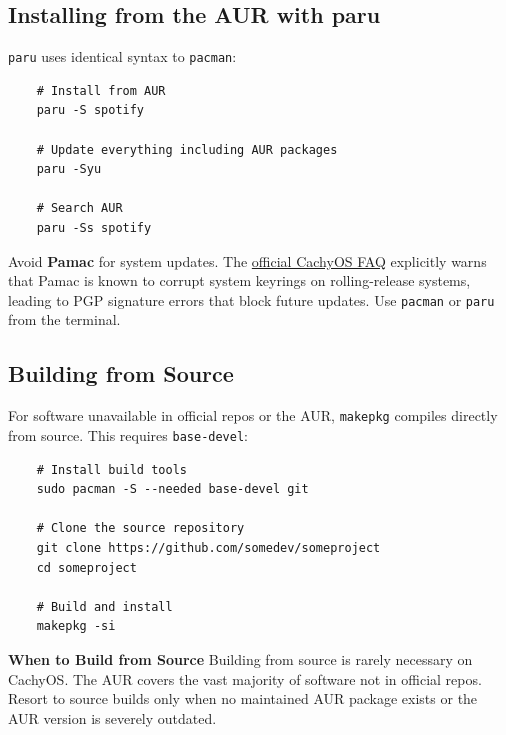 \documentclass{article}
\newcommand{\code}[1]{\colorbox{codebg}{\texttt{#1}}}
\begin{document}
\subsection{Installing from the AUR with paru}

\code{paru} uses identical syntax to \code{pacman}:

\begin{verbatim}
	# Install from AUR
	paru -S spotify
	
	# Update everything including AUR packages
	paru -Syu
	
	# Search AUR
	paru -Ss spotify
\end{verbatim}

\begin{tcolorbox}[arc=12pt, outer arc=10pt,
	colback=red!5!white, colframe=red!60!black,
	title=\textbf{Warning}]
	Avoid \textbf{Pamac} for system updates. The
	\href{https://wiki.cachyos.org/cachyos_basic/faq/}{official CachyOS FAQ}
	explicitly warns that Pamac is known to corrupt system keyrings on rolling-release
	systems, leading to PGP signature errors that block future updates. Use
	\code{pacman} or \code{paru} from the terminal.
\end{tcolorbox}

\subsection{Building from Source}

For software unavailable in official repos or the AUR, \code{makepkg} compiles
directly from source. This requires \code{base-devel}:

\begin{verbatim}
	# Install build tools
	sudo pacman -S --needed base-devel git
	
	# Clone the source repository
	git clone https://github.com/somedev/someproject
	cd someproject
	
	# Build and install
	makepkg -si
\end{verbatim}

\begin{callout}{\textbf{When to Build from Source}}
	Building from source is rarely necessary on CachyOS. The AUR covers the vast
	majority of software not in official repos. Resort to source builds only when no
	maintained AUR package exists or the AUR version is severely outdated.
\end{callout}
\end{document}
